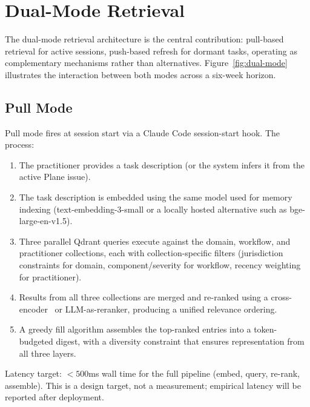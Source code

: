 \documentclass[11pt]{article}
\begin{document}
\section{Dual-Mode Retrieval}
\label{sec:dual-mode}

The dual-mode retrieval architecture is the central contribution: pull-based retrieval for active sessions, push-based refresh for dormant tasks, operating as complementary mechanisms rather than alternatives.
Figure~\ref{fig:dual-mode} illustrates the interaction between both modes across a six-week horizon.



\subsection{Pull Mode}
\label{sec:pull-mode}

Pull mode fires at session start via a Claude Code session-start hook.
The process:

\begin{enumerate}[leftmargin=*, nosep]
  \item The practitioner provides a task description (or the system infers it from the active Plane issue).
  \item The task description is embedded using the same model used for memory indexing (text-embedding-3-small or a locally hosted alternative such as bge-large-en-v1.5).
  \item Three parallel Qdrant queries execute against the domain, workflow, and practitioner collections, each with collection-specific filters (jurisdiction constraints for domain, component/severity for workflow, recency weighting for practitioner).
  \item Results from all three collections are merged and re-ranked using a cross-encoder~\citep{nogueira2019passage} or LLM-as-reranker, producing a unified relevance ordering.
  \item A greedy fill algorithm assembles the top-ranked entries into a token-budgeted digest, with a diversity constraint that ensures representation from all three layers.
\end{enumerate}

Latency target: $< 500$ms wall time for the full pipeline (embed, query, re-rank, assemble).
This is a design target, not a measurement; empirical latency will be reported after deployment.
\end{document}
